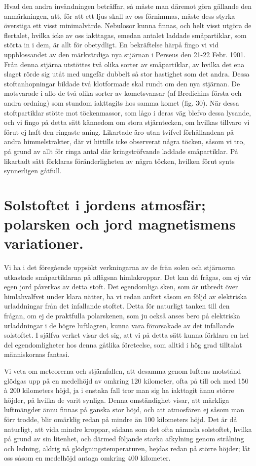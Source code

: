 \documentclass[a4paper, 12pt, oneside, swedish]{article}
\begin{document}
Hvad den andra invändningen beträffar, så måste man däremot göra gällande den anmärkningen, att, för att ett ljus skall av oss förnimmas, måste dess styrka överstiga ett visst minimalvärde. Nebulosor kunna finnas, och helt visst utgöra de flertalet, hvilka icke av oss iakttagas, emedan antalet laddade småpartiklar, som störta in i dem, är allt för obetydligt. En bekräftelse härpå fingo vi vid uppblossandet av den märkvärdiga nya stjärnan i Perseus den 21-22 Febr. 1901. Från denna stjärna utstöttes två olika sorter av småpartiklar, av hvilka det ena slaget rörde sig utåt med ungefär dubbelt så stor hastighet som det andra. Dessa stoftanhopningar bildade två klotformade skal rundt om den nya stjärnan. De motsvarade i allo de två olika sorter av kometsvansar (af Bredichins första och andra ordning) som stundom iakttagits hos samma komet (fig. 30). När dessa stoftpartiklar stötte mot töckenmassor, som lågo i deras väg blefvo dessa lysande, och vi fingo på detta sätt kännedom om stora stjärntecken, om hvilkas tillvaro vi förut ej haft den ringaste aning. Likartade äro utan tvifvel förhållandena på andra himmelstrakter, där vi hittills icke observerat några töcken, såsom vi tro, på grund av allt för ringa antal där kringströfvande laddade småpartiklar. På likartadt sätt förklaras föränderligheten av några töcken, hvilken förut synts synnerligen gåtfull.
\clearpage
\section{Solstoftet i jordens atmosfär; polarsken och jord magnetismens variationer.}
\paragraph{}
Vi ha i det föregående uppsökt verkningarna av de frän solen och stjärnorna utkastade småpartiklarna på aflägsna himlakroppar. Det kan då frågas, om ej vår egen jord påverkas av detta stoft. Det egendomliga sken, som är utbredt över himlahvalfvet under klara nätter, ha vi redan anfört såsom en följd av elektriska urladdningar från det infallande stoftet. Detta för naturligt tanken till den frågan, om ej de praktfulla polarskenen, som ju också anses bero på elektriska urladdningar i de högre luftlagren, kunna vara förorsakade av det infallande solstoftet. I själfva verket visar det sig, att vi på detta sätt kunna förklara en hel del egendomligheter hos denna gåtlika företeelse, som alltid i hög grad tilltalat människornas fantasi.

Vi veta om meteorerna och stjärnfallen, att desamma genom luftens motstånd glödgas upp på en medelhöjd av omkring 120 kilometer, ofta på till och med 150 à 200 kilometers höjd, ja i enstaka fall tror man sig ha iakttagit ännu större höjder, på hvilka de varit synliga. Denna omständighet visar, att märkliga luftmängder ännu finnas på ganska stor höjd, och att atmosfären ej såsom man förr trodde, blir omärklig redan på mindre än 100 kilometers höjd. Det är då naturligt, att vida mindre kroppar, sådana som det ofta nämnda solstoftet, hvilka på grund av sin litenhet, och därmed följande starka afkylning genom strålning och ledning, aldrig nå glödgningstemperaturen, hejdas redan på större höjder; låt oss såsom en medelhöjd antaga omkring 400 kilometer.
\end{document}
